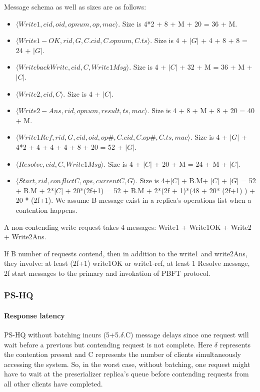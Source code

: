 \documentclass[twocolumn,10pt]{article}
\begin{document}
Message schema as well as sizes are as follows:
\begin{itemize}
\item{} $\langle Write1, cid, oid, opnum, op, mac\rangle$. Size is 4*2 + 8 + M + 20 = 36 + M.
\item{} $\langle Write1-OK, rid, G, C.cid, C.opnum, C.ts\rangle$. Size is 4 + $|G|$ + 4 + 8 + 8 
= 24 + $|G|$.
\item{} $\langle WritebackWrite, cid, C, Write1Msg\rangle$. Size is 4 + $|C|$ + 32 + M = 36 + M 
+ $|C|$.
\item{} $\langle Write2, cid, C\rangle$. Size is 4 + $|C|$.
\item{} $\langle Write2-Ans, rid, opnum, result, ts, mac\rangle$. Size is 4 + 8 + M + 8 + 20
 = 40 + M.
\item{} $\langle Write1Ref, rid, G, cid, oid, op\#, C.cid, C.op\#, C.ts, mac\rangle$. Size is 4 
+ $|G|$ + 4*2 + 4 + 4 + 4 + 8 + 20 = 52 + $|G|$.
\item{} $\langle Resolve, cid, C, Write1Msg\rangle$. Size is 4 + $|C|$ + 20 + M = 24 + M + $|C|$.

\item{} $\langle Start, rid, conflictC, ops, currentC, G\rangle$. Size is 4+$|C|$ + B.M+ $|C|$ + $|G|$ = 52 + B.M + 2*$|C|$ + 20*(2f+1) = 52 + B.M + 2*(2f + 1)*(48 + 20* (2f+1) ) + 20 * (2f+1). 
We assume B message exist in a replica's operations list when a contention happens. 
\end{itemize}


A non-contending write request takes 4 messages: Write1 + Write1OK + Write2 + Write2Ans.

If B number of requests contend, then in addition to the write1 and write2Ans, they involve:
at least (2f+1) write1OK or write1-ref, at least 1 Resolve message, 
2f start messages to the primary and invokation of PBFT protocol.




\subsubsection{PS-HQ}



\paragraph{Response latency}
PS-HQ without batching incurs (5+5.$\delta$.C) message delays 
since one request will wait before a previous but contending request is not complete. Here $\delta$
represents the contention present and C represents the number of clients simultaneously accessing
the system. So, in the worst case, without batching, one request might have to wait at the
preserializer replica's queue before contending requests from all other clients have completed.
\end{document}
